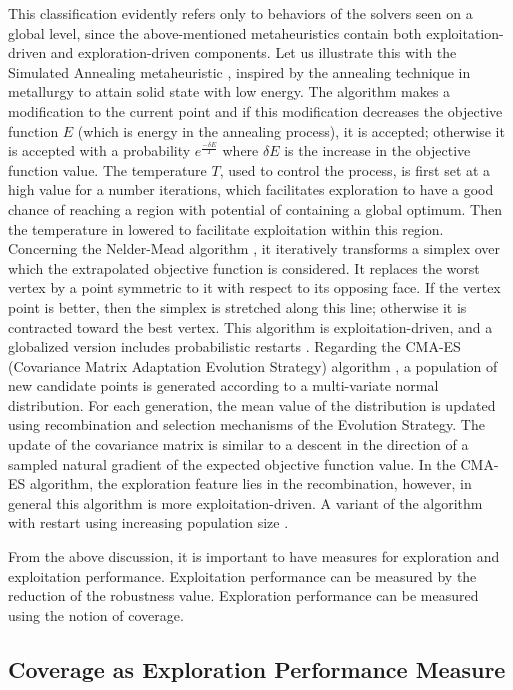 This classification evidently refers only to behaviors of the solvers seen on a global level, since the above-mentioned metaheuristics contain both exploitation-driven and exploration-driven components. Let us illustrate this with the Simulated Annealing metaheuristic \cite{Kirkpatrick83optimizationby}, inspired by the annealing technique in metallurgy to attain solid state with low energy. The algorithm makes a modification to the current point and if this modification decreases the objective function $E$ (which is energy in the annealing process), it is accepted; otherwise it is accepted with a probability $e^{\frac{-\delta E}{T}}$ where $\delta E$ is the increase in the objective function value. The temperature $T$, used to control the process, is first set at a high value for a number iterations, which facilitates exploration to have a good chance of reaching a region with potential of containing a global optimum. Then the temperature in lowered to facilitate exploitation within this region. Concerning the Nelder-Mead algorithm \cite{NelderMead65}, it iteratively transforms a simplex over which the extrapolated objective function is considered. It replaces the worst vertex by a point symmetric to it with respect to its opposing face. If the vertex point is better, then the simplex is stretched along this line; otherwise it is contracted toward the best vertex. This algorithm is exploitation-driven, and a globalized version includes probabilistic restarts \cite{CHANG2012684}. Regarding the CMA-ES (Covariance Matrix Adaptation Evolution Strategy) algorithm \cite{hansen2006eda}, a population of new candidate points is generated according to a multi-variate normal distribution. For each generation, the mean value of the distribution is updated using recombination and selection mechanisms of the Evolution Strategy. The update of the covariance matrix is similar to a descent in the direction of a sampled natural gradient of the expected objective function value. In the CMA-ES algorithm, the exploration feature lies in the recombination, however, in general this algorithm is more exploitation-driven. A variant of the algorithm with restart using increasing population size \cite{hansen2006eda}.

From the above discussion, it is important to have measures for exploration and exploitation performance. Exploitation performance can be measured by the reduction of the robustness value. Exploration performance can be measured using the notion of coverage. 


\subsection{Coverage as Exploration Performance Measure}	

